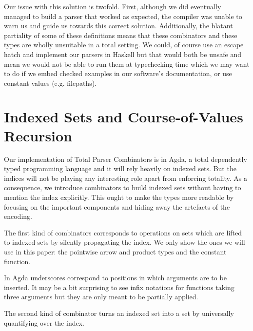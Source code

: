 Our issue with this solution is twofold. First, although we did
eventually managed to build a parser that worked as expected,
the compiler was unable to warn us and guide us towards this
correct solution. Additionally, the blatant partiality of
some of these definitions means that these combinators and
these types are wholly unsuitable in a total setting. We could, of
course use an escape hatch and implement our parsers in Haskell
but that would both be unsafe and mean we would not be able
to run them at typechecking time which we may want to do if
we embed checked examples in our software's documentation,
or use constant values (e.g. filepaths).

\section{Indexed Sets and Course-of-Values Recursion}

Our implementation of Total Parser Combinators is in Agda,
a total dependently typed programming language and it will
rely heavily on indexed sets. But the indices will not be
playing any interesting role apart from enforcing totality.
As a consequence, we introduce combinators to build indexed
sets without having to mention the index explicitly. This
ought to make the types more readable by focusing on the
important components and hiding away the artefacts of the
encoding.

The first kind of combinators corresponds to operations on
sets which are lifted to indexed sets by silently propagating
the index. We only show the ones we will use in this paper:
the pointwise arrow and product types and the constant function.


\begin{minipage}{0.55\textwidth}
\end{minipage}
\begin{minipage}{0.30\textwidth}
\end{minipage}

 In Agda underscores correspond to
positions in which arguments are to be inserted. It may be a
bit surprising to see infix notations for functions taking
three arguments but they are only meant to be partially applied.
\medskip{}

The second kind of combinator turns an indexed set into a set
by universally quantifying over the index.

